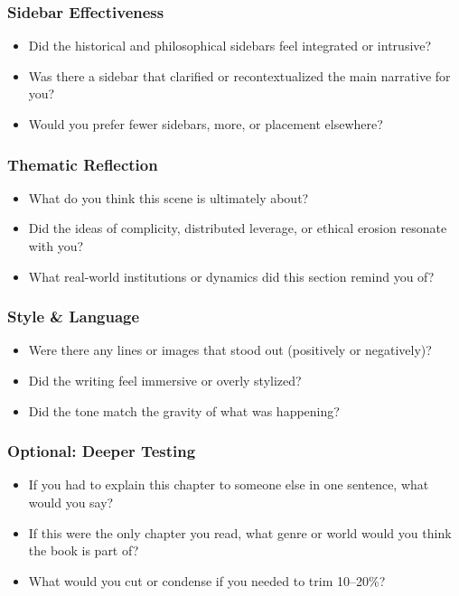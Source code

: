 \subsubsection{Sidebar Effectiveness}

\begin{itemize}
  \item Did the historical and philosophical sidebars feel integrated or intrusive?
  \item Was there a sidebar that clarified or recontextualized the main narrative for you?
  \item Would you prefer fewer sidebars, more, or placement elsewhere?
\end{itemize}

\subsubsection{Thematic Reflection}

\begin{itemize}
  \item What do you think this scene is ultimately about?
  \item Did the ideas of complicity, distributed leverage, or ethical erosion resonate with you?
  \item What real-world institutions or dynamics did this section remind you of?
\end{itemize}

\subsubsection{Style \& Language}

\begin{itemize}
  \item Were there any lines or images that stood out (positively or negatively)?
  \item Did the writing feel immersive or overly stylized?
  \item Did the tone match the gravity of what was happening?
\end{itemize}

\subsubsection{Optional: Deeper Testing}

\begin{itemize}
  \item If you had to explain this chapter to someone else in one sentence, what would you say?
  \item If this were the only chapter you read, what genre or world would you think the book is part of?
  \item What would you cut or condense if you needed to trim 10–20\%?
\end{itemize}





